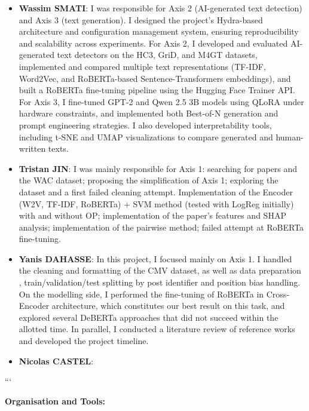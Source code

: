 \documentclass[11pt,a4paper]{article}
\begin{document}
\begin{itemize}

    \item \textbf{Wassim SMATI}: I was  responsible for Axis 2 (AI-generated text detection) and Axis 3 (text generation). I designed the project's Hydra-based architecture and configuration management system, ensuring reproducibility and scalability across experiments. For Axis 2, I developed and evaluated AI-generated text detectors on the HC3, GriD, and M4GT datasets, implemented and compared multiple text representations (TF-IDF, Word2Vec, and RoBERTa-based Sentence-Transformers embeddings), and built a RoBERTa fine-tuning pipeline using the Hugging Face Trainer API. For Axis 3, I fine-tuned GPT-2 and Qwen 2.5 3B models using QLoRA under hardware constraints, and implemented both Best-of-N generation and prompt engineering strategies. I also developed interpretability tools, including t-SNE and UMAP visualizations to compare generated and human-written texts.

    \item \textbf{Tristan JIN}: I was mainly responsible for Axis 1: searching for papers and the WAC dataset; proposing the simplification of Axis 1; exploring the dataset and a first failed cleaning attempt. Implementation of the Encoder (W2V, TF-IDF, RoBERTa) + SVM method (tested with LogReg initially) with and without OP; implementation of the paper's features and SHAP analysis; implementation of the pairwise method; failed attempt at RoBERTa fine-tuning.

    \item \textbf{Yanis DAHASSE}: In this project, I focused mainly on Axis 1. I handled the cleaning and formatting of the CMV dataset, as well as data preparation , train/validation/test splitting by post identifier and position bias handling. On the modelling side, I performed the fine-tuning of RoBERTa in Cross-Encoder architecture, which constitutes our best result on this task, and explored several DeBERTa approaches that did not succeed within the allotted time. In parallel, I conducted a literature review of reference works and developed the project timeline.

    \item \textbf{Nicolas CASTEL}:

\end{itemize}
```

\vspace{1cm}

\textbf{Organisation and Tools:}
\end{document}
